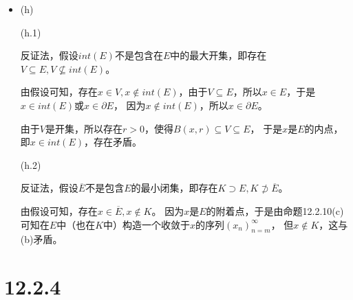 \documentclass{article}
\begin{document}
\begin{itemize}
      \item (h)

            (h.1)

            反证法，假设$int(E)$不是包含在$E$中的最大开集，即存在$V \subseteq E, V \not \subseteq int(E)$。

            由假设可知，存在$x \in V, x \notin int(E)$，由于$V \subseteq E$，所以$x \in E$，于是$x \in int(E)$或$x \in \partial E$，
            因为$x \notin int(E)$，所以$x \in \partial E$。

            由于$V$是开集，所以存在$r > 0$，使得$B(x, r) \subseteq V \subseteq E$，
            于是$x$是$E$的内点，即$x \in int(E)$，存在矛盾。

            (h.2)

            反证法，假设$\overline{E}$不是包含$E$的最小闭集，即存在$K \supset E, K \not \supset \overline{E}$。

            由假设可知，存在$x \in \overline{E}, x \notin K$。
            因为$x$是$E$的附着点，于是由命题12.2.10(c)可知在$E$中（也在$K$中）构造一个收敛于$x$的序列$(x_n)_{n = m}^\infty$，
            但$x \notin K$，这与(b)矛盾。
\end{itemize}

\section*{12.2.4}
\end{document}
